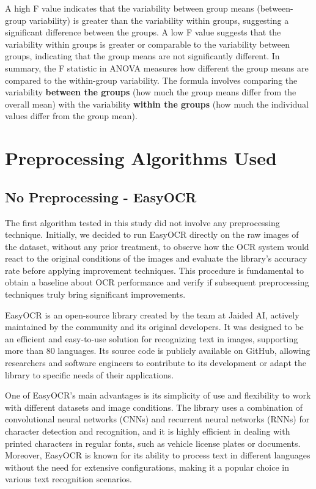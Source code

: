 \documentclass[conference]{IEEEtran}
\begin{document}
	A high F value indicates that the variability between group means (between-group variability) is greater than the variability within groups, suggesting a significant difference between the groups. A low F value suggests that the variability within groups is greater or comparable to the variability between groups, indicating that the group means are not significantly different. In summary, the F statistic in ANOVA measures how different the group means are compared to the within-group variability. The formula involves comparing the variability \textbf{between the groups} (how much the group means differ from the overall mean) with the variability \textbf{within the groups} (how much the individual values differ from the group mean).
	
	\section{Preprocessing Algorithms Used}
	
	\subsection{No Preprocessing - EasyOCR}
	
	The first algorithm tested in this study did not involve any preprocessing technique. Initially, we decided to run EasyOCR directly on the raw images of the dataset, without any prior treatment, to observe how the OCR system would react to the original conditions of the images and evaluate the library's accuracy rate before applying improvement techniques. This procedure is fundamental to obtain a baseline about OCR performance and verify if subsequent preprocessing techniques truly bring significant improvements.
	
	EasyOCR is an open-source library created by the team at Jaided AI, actively maintained by the community and its original developers. It was designed to be an efficient and easy-to-use solution for recognizing text in images, supporting more than 80 languages. Its source code is publicly available on GitHub, allowing researchers and software engineers to contribute to its development or adapt the library to specific needs of their applications.
	
	One of EasyOCR's main advantages is its simplicity of use and flexibility to work with different datasets and image conditions. The library uses a combination of convolutional neural networks (CNNs) and recurrent neural networks (RNNs) for character detection and recognition, and it is highly efficient in dealing with printed characters in regular fonts, such as vehicle license plates or documents. Moreover, EasyOCR is known for its ability to process text in different languages without the need for extensive configurations, making it a popular choice in various text recognition scenarios.
	
\end{document}
